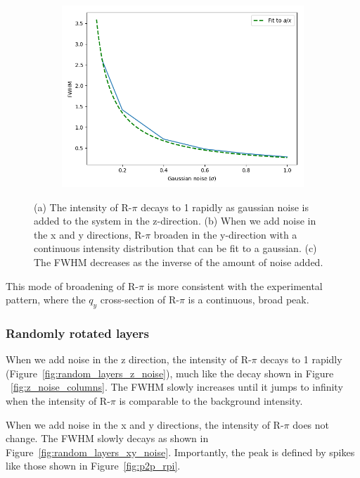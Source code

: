 \documentclass{article}
\begin{document}
\begin{figure}[!htb]
\begin{subfigure}{0.32\textwidth}
  \includegraphics[width=\textwidth]{random_columns_xy_noise.png}
  \caption{}\label{fig:FWHM_columns}
  \end{subfigure}
  \caption{(a) The intensity of R-$\pi$ decays to 1 rapidly as gaussian noise is 
   added to the system in the z-direction. (b) When we add noise in the x and y directions, R-$\pi$
   broaden in the y-direction with a continuous intensity distribution that can be
   fit to a gaussian. (c) The FWHM decreases as the inverse of the amount of 
   noise added.}\label{fig:columns_noise}
  \end{figure}

  This mode of broadening of R-$\pi$ is more consistent with the experimental
  pattern, where the $q_y$ cross-section of R-$\pi$ is a continuous, broad peak. 

  \subsubsection{Randomly rotated layers}

  When we add noise in the z direction, the intensity of R-$\pi$ decays to 1
  rapidly (Figure~\ref{fig:random_layers_z_noise}), much like the decay shown in
  Figure ~\ref{fig:z_noise_columns}. The FWHM slowly increases until it jumps to
  infinity when the intensity of R-$\pi$ is comparable to the background
  intensity.

  When we add noise in the x and y directions, the intensity of R-$\pi$ does
  not change. The FWHM slowly decays as shown in
  Figure~\ref{fig:random_layers_xy_noise}. Importantly, the peak is defined by
  spikes like those shown in Figure~\ref{fig:p2p_rpi}.
\end{document}
